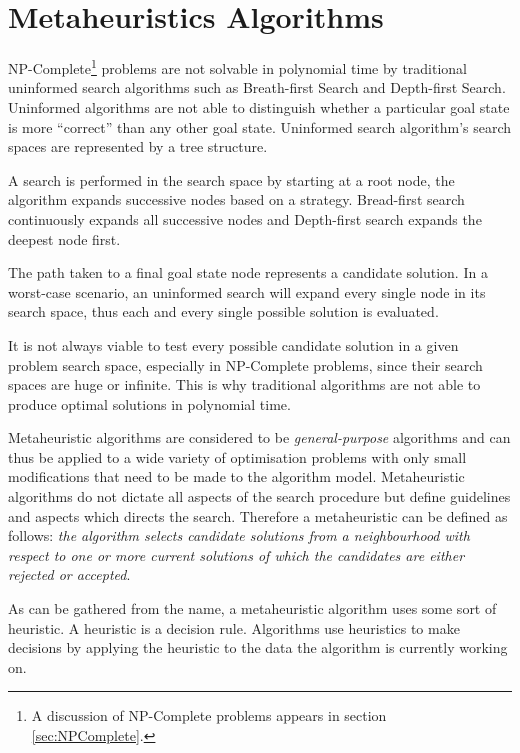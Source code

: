 \section{Metaheuristics Algorithms}
NP-Complete\footnote{A discussion of NP-Complete problems appears in section \ref{sec:NPComplete}.} problems are not solvable in polynomial time by traditional uninformed search algorithms such as Breath-first Search and Depth-first Search\cite{AIModernApproach}. 
Uninformed algorithms are not able to distinguish whether a particular goal state is more ``correct'' than any other goal state\cite{AIModernApproach}. Uninformed search algorithm's search spaces are represented by a tree structure\cite{AIModernApproach}. 

A search is performed in the search space by starting at a root node, the algorithm expands successive nodes based on a strategy\cite{AIModernApproach}. Bread-first search continuously expands all successive nodes and Depth-first search expands the deepest node first\cite{AIModernApproach}.

The path taken to a final  goal state node represents a candidate solution\cite{AIModernApproach}. In a worst-case scenario, an uninformed search will expand every single node in its search space, thus each and every single possible solution is evaluated\cite{AIModernApproach}.

It is not always viable to test every possible candidate solution in a given problem search space, especially in NP-Complete problems, since their search spaces are huge or infinite. This is why traditional algorithms are not able to produce optimal solutions in polynomial time\cite{AIModernApproach}.

Metaheuristic algorithms are considered to be \emph{general-purpose} algorithms and can thus be applied to a wide variety of optimisation problems with only small modifications that need to be made to the algorithm model\cite{MetaGraph}.
Metaheuristic algorithms do not dictate all aspects of the search procedure but define guidelines and aspects which directs the search\cite{HandbookofMH}. Therefore a metaheuristic can be defined as follows: \emph{the algorithm selects candidate solutions from a neighbourhood with respect to one or more current solutions of which the candidates are either rejected or accepted}\cite{HandbookofMH}.

As can be gathered from the name, a metaheuristic algorithm uses some sort of heuristic. A heuristic is a decision rule. Algorithms use heuristics to make decisions by applying the heuristic to the data the algorithm is currently working on\cite{AIModernApproach,NatureInspiredMetaHeuristic}.

